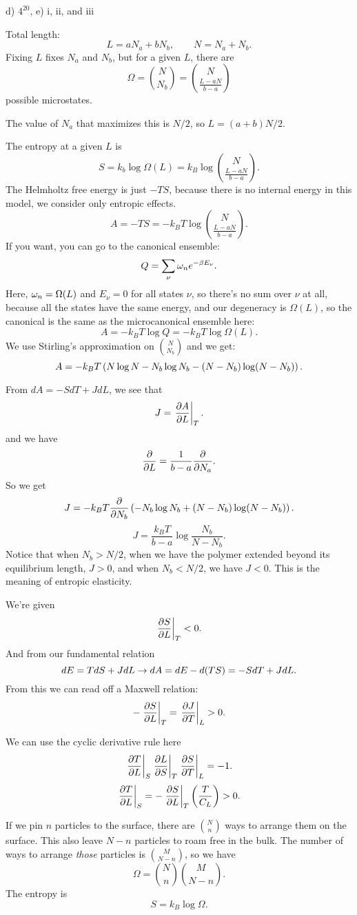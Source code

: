 \documentclass[12pt]{article}
\begin{document}
d) $4^{20}$, \qquad e) i, ii, and iii

\hrulefill

 Total length:
\[ L = aN_a + bN_b, \qquad N = N_a + N_b.\]
Fixing $L$ fixes $N_a$ and $N_b$, but for a given $L$, there are
\[ \Omega = { N \choose N_b} = { N \choose \frac{L-aN}{b-a} }\]
possible microstates.

The value of $N_a$ that maximizes this is $N/2$, so $L = (a+b)N/2$.

 The entropy at a given $L$ is
\[ S = k_b \log \Omega(L) = k_B \log { N \choose \frac{L-aN}{b-a} }.\]
The Helmholtz free energy is just $-TS$,  because there is no internal energy in this model, we consider only entropic effects.
\[ A = -TS = -k_BT \log { N \choose \frac{L-aN}{b-a} }.\]
If you want, you can go to the canonical ensemble:
\[ Q = \sum_\nu \omega_n e^{-\beta E_\nu}.\]
Here, $\omega_n = \Omega(L)$ and $E_\nu = 0$ for all states $\nu$, so there's no sum over $\nu$ at all, because all the states have the same energy, and our degeneracy is $\Omega(L)$, so the canonical is the same as the microcanonical ensemble here:
\[ A = -k_BT \log Q = -k_BT \log \Omega(L).\]
We use Stirling's approximation on ${N \choose N_b}$ and we get:
\[ A = -k_BT \left( N\log N - N_b \log N_b - (N-N_b) \log(N-N_b) \right).\]

 From $dA = -SdT + JdL$, we see that
\[ J = \left.\frac{\partial{A}}{\partial{L}}\right|_{T}.\]
and we have
\[ \frac{\partial {}}{\partial {L}} = \frac{1}{b-a}\frac{\partial {}}{\partial {N_a}}.\]
So we get
\[ J = -k_BT \frac{\partial {}}{\partial {N_b}} \left( - N_b \log N_b + (N-N_b)\log(N-N_b) \right).\]
\[ J = \frac{k_BT}{b-a} \log \frac{N_b}{N-N_b}.\]
Notice that when $N_b > N/2$, when we have the polymer extended beyond its equilibrium length, $J > 0$, and when $N_b < N/2$, we have $J<0$. This is the meaning of entropic elasticity.

\hrulefill

 We're given
\[ \left.\frac{\partial{S}}{\partial{L}}\right|_{T} < 0.\]
And from our fundamental relation
\[ dE = TdS + JdL \rightarrow dA = dE - d(TS) = -S dT + JdL.\]
From this we can read off a Maxwell relation:
\[ -\left.\frac{\partial{S}}{\partial{L}}\right|_{T} = \left.\frac{\partial{J}}{\partial{T}}\right|_{L} > 0.\]

 We can use the cyclic derivative rule here
\[ \left.\frac{\partial{T}}{\partial{L}}\right|_{S}\left.\frac{\partial{L}}{\partial{S}}\right|_{T} \left.\frac{\partial{S}}{\partial{T}}\right|_{L} = -1.\]
\[ \left.\frac{\partial{T}}{\partial{L}}\right|_{S} = -\left.\frac{\partial{S}}{\partial{L}}\right|_{T} \left(\frac{T}{C_L}\right) > 0.\]

\hrulefill

 If we pin $n$ particles to the surface, there are ${N \choose n}$ ways to arrange them on the surface. This also leave $N-n$ particles to roam free in the bulk. The number of ways to arrange \emph{those} particles is ${M \choose N-n}$, so we have
\[ \Omega = {N \choose n} {M \choose N-n}.\]
The entropy is
\[ S = k_B\log \Omega.\]
\end{document}
